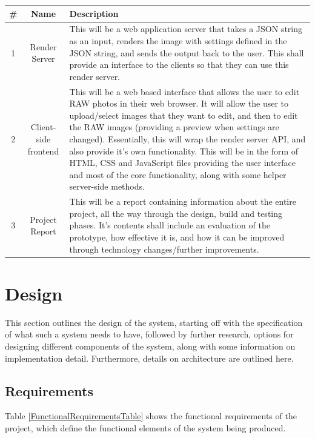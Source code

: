 \documentclass[12pt,a4paper]{article}
\begin{document}
\begin{center}
  \begin{tabular}{| c | c | p{12cm} |}
    \hline
    \textbf{\#} & \textbf{Name} & \textbf{Description}\\
    \hline
    1 & Render Server & This will be a web application server that takes a JSON string as an input,
    renders the image with settings defined in the JSON string, and sends the output back
    to the user. This shall provide an interface to the clients so that they can use this
    render server. \\
    \hline
    2 & Client-side frontend & This will be a web based interface that allows the user to
    edit RAW photos in their web browser. It will allow the user to upload/select images that they
    want to edit, and then to edit the RAW images (providing a preview when settings are changed). Essentially,
    this will wrap the render server API, and also provide it's own functionality. This will
    be in the form of HTML, CSS and JavaScript files providing the user interface and most of the core
    functionality, along with some helper server-side methods. \\
    \hline
    3 & Project Report & This will be a report containing information about the entire project,
    all the way through the design, build and testing phases. It's contents shall include an evaluation of
    the prototype, how effective it is, and how it can be improved through technology changes/further improvements.\\
    \hline
  \end{tabular}
\end{center}
\section{Design}

This section outlines the design of the system, starting off with the specification of what such a system
needs to have, followed by further research, options for designing different components of the system,
along with some information on implementation detail. Furthermore, details on architecture are outlined here.

\subsection{Requirements}
Table \ref{FunctionalRequirementsTable} shows the functional requirements of the project,
which define the functional elements of the system being produced.
\end{document}

